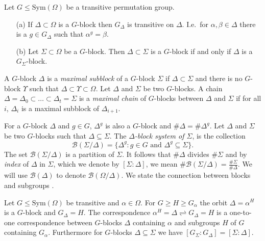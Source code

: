 \documentclass[prodmod,acmtalg]{acmsmall}
\newcommand{\Blocks}[1]{{\ensuremath{\mathcal{B}\left(#1\right)}}}
\newcommand{\Sym}[1]{{\ensuremath{\mathrm{Sym}\left(#1\right)}}}
\begin{document}
\begin{proposition}\label{prop-block-subblock}
  Let $G\leq \Sym{\Omega}$ be a transitive permutation group.
\begin{itemize}
\item[(a)] If $\Delta\subset\Omega$ is a $G$-block then $G_\Delta$ is
  transitive on $\Delta$. I.e.\ for $\alpha,\beta\in\Delta$ there is a
  $g\in G_\Delta$ such that $\alpha^g=\beta$.
\item[(b)] Let $\Sigma\subset\Omega$ be a $G$-block. Then
  $\Delta\subset \Sigma$ is a $G$-block if and only if $\Delta$ is a
  $G_\Sigma$-block.
\end{itemize}
\end{proposition}

A $G$-block $\Delta$ is a \emph{maximal subblock} of a $G$-block
$\Sigma$ if $\Delta \subset \Sigma$ and there is no $G$-block
$\Upsilon$ such that $\Delta \subset \Upsilon \subset \Omega$. Let
$\Delta$ and $\Sigma$ be two $G$-blocks. A chain $\Delta = \Delta_0
\subset \ldots \subset \Delta_t = \Sigma$ is a \emph{maximal chain} of
$G$-blocks between $\Delta$ and $\Sigma$ if for all $i$, $\Delta_i$ is
a maximal subblock of $\Delta_{i+1}$.

For a $G$-block $\Delta$ and $g \in G$, $\Delta^g$ is also a $G$-block
and $\# \Delta = \# \Delta^g$. Let $\Delta$ and $\Sigma$ be two
$G$-blocks such that $\Delta \subseteq \Sigma$.  The
\emph{$\Delta$-block system of $\Sigma$}, is the collection
\[
\Blocks{\Sigma/\Delta} = \{ \Delta^g : g \in G \textrm{ and } \Delta^g
\subseteq \Sigma \}.
\]
The set $\Blocks{\Sigma/\Delta}$ is a partition of $\Sigma$.  It
follows that $\# \Delta$ divides $\# \Sigma$ and by \emph{index} of
$\Delta$ in $\Sigma$, which we denote by $[\Sigma:\Delta]$, we mean
$\# \Blocks{\Sigma/\Delta} = \frac{\# \Sigma}{\# \Delta}$. We will use
$\Blocks{\Delta}$ to denote $\Blocks{\Omega/\Delta}$. We state the
connection between blocks and subgroups \cite[Theorem
7.5]{wielandt64finite}.

\begin{theorem}\label{thm-blocks-galois}
  Let $G\leq\Sym{\Omega}$ be transitive and $\alpha\in\Omega$. For $G
  \geq H \geq G_\alpha$ the orbit $\Delta = \alpha^H$ is a $G$-block
  and $G_\Delta = H$. The correspondence $\alpha^H = \Delta
  \rightleftharpoons G_\Delta = H$ is a one-to-one correspondence
  between $G$-blocks $\Delta$ containing $\alpha$ and subgroups $H$ of
  $G$ containing $G_\alpha$. Furthermore for $G$-blocks $\Delta
  \subseteq \Sigma$ we have $[G_\Sigma : G_\Delta] = [\Sigma :
  \Delta]$.
\end{theorem}
\end{document}
